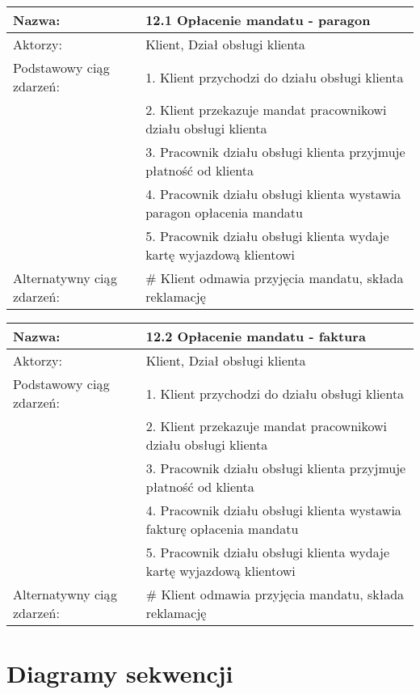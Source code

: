 \begin{center}
\begin{tabular}{|L{3cm}  L{13cm}|}
\hline
Nazwa: & 12.1 Opłacenie mandatu - paragon\\ \hline
Aktorzy: & Klient,  Dział obsługi klienta \\ \hline
Podstawowy ciąg zdarzeń: & 1. Klient przychodzi do działu obsługi klienta \\
 & 2. Klient przekazuje mandat pracownikowi działu obsługi klienta \\
 & 3. Pracownik działu obsługi klienta przyjmuje płatność od klienta \\
 & 4. Pracownik działu obsługi klienta wystawia paragon opłacenia mandatu \\
 & 5. Pracownik działu obsługi klienta wydaje kartę wyjazdową klientowi \\
 \hline
Alternatywny ciąg zdarzeń:  & \# Klient odmawia przyjęcia mandatu, składa reklamację \\
 \hline
\end{tabular}

\vspace{1cm}

\begin{tabular}{|L{3cm}  L{13cm}|}
\hline
Nazwa: & 12.2 Opłacenie mandatu - faktura\\ \hline
Aktorzy: & Klient,  Dział obsługi klienta \\ \hline
Podstawowy ciąg zdarzeń: & 1. Klient przychodzi do działu obsługi klienta \\
 & 2. Klient przekazuje mandat pracownikowi działu obsługi klienta \\
 & 3. Pracownik działu obsługi klienta przyjmuje płatność od klienta \\
 & 4. Pracownik działu obsługi klienta wystawia fakturę opłacenia mandatu \\
 & 5. Pracownik działu obsługi klienta wydaje kartę wyjazdową klientowi \\
 \hline
Alternatywny ciąg zdarzeń:  & \# Klient odmawia przyjęcia mandatu, składa reklamację \\
 \hline
\end{tabular}
\end{center}

\newpage
\section{Diagramy sekwencji}
\begin{center}
\newpage

\newpage

\newpage

\newpage

\newpage

\newpage

\newpage

\newpage

\newpage

\end{center}

